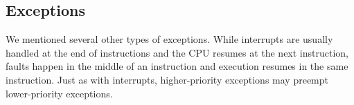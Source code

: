 
\subsection{Exceptions}
We mentioned several other types of exceptions. While interrupts are
usually handled at the end of instructions and the CPU resumes at the
next instruction, faults happen in the middle of an instruction and
execution resumes in the same instruction. Just as with interrupts,
higher-priority exceptions may preempt lower-priority exceptions.